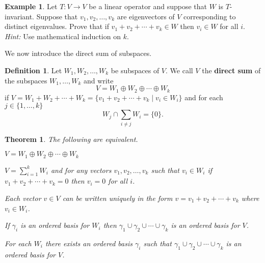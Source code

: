 \documentclass[12pt]{article}
\newcommand{\tv}{T:V\rightarrow V}
\newtheorem{theorem}{Theorem}[section]
\theoremstyle{definition}
\newtheorem{definition}{Definition}[section]
\newtheorem{example}{Example}[section]
\begin{document}
\begin{example}\label{exm:v-sum}
Let $\tv$ be a linear operator and suppose that $W$ is $T$-invariant.  Suppose that $v_1,v_2,\ldots,v_k$ are eigenvectors of $V$ corresponding to distinct eigenvalues.  Prove that if $v_1+v_2+\cdots+v_k\in W$ then $v_i \in W$ for all $i$.  \textit{Hint:}  Use mathematical induction on $k$.
\end{example}

We now introduce the direct sum of subspaces.

\begin{definition}
Let $W_1,W_2,\ldots,W_k$ be subspaces of $V$.  We call $V$ the \textbf{direct sum} of the subspaces $W_1,\ldots,W_k$ and write 
\[
V = W_1\oplus W_2 \oplus \cdots \oplus W_k
\]
if $V=W_1+W_2+\cdots+W_k = \{v_1+v_2+\cdots+v_k\;|\; v_i \in W_i\}$ and for each $j\in\{1,\ldots,k\}$
\[
W_j \cap \sum_{i\neq j} W_i = \{0\}.
\]
\end{definition}

\begin{theorem}
The following are equivalent.
\begin{compactenum}[(a)]
\item $V=W_1\oplus W_2\oplus \cdots\oplus W_k$
\item $V=\sum_{i=1}^k W_i$ and for any vectors $v_1,v_2,\ldots,v_k$ such that $v_i\in W_i$ if $v_1+v_2+\cdots+v_k=0$ then $v_i=0$ for all $i$.
\item Each vector $v\in V$ can be written uniquely in the form $v=v_1+v_2+\cdots+v_k$ where $v_i \in W_i$.
\item If $\gamma_i$ is an ordered basis for $W_i$ then $\gamma_1\cup\gamma_2\cup\cdots\cup\gamma_k$ is an ordered basis for $V$.
\item For each $W_i$ there exists an ordered basis $\gamma_i$ such that $\gamma_1\cup\gamma_2\cup\cdots\cup\gamma_k$ is an ordered basis for $V$.
\end{compactenum}
\end{theorem}
\end{document}
